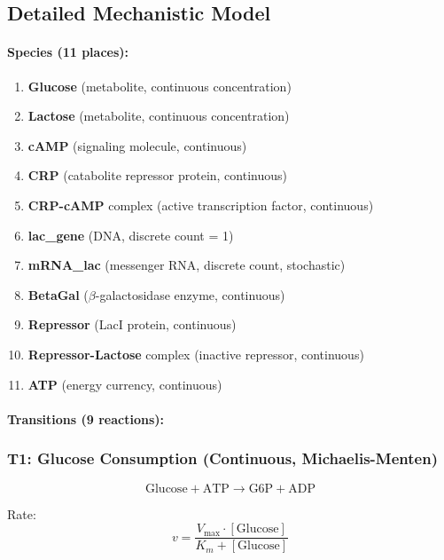 \subsection{Detailed Mechanistic Model}
\label{subsec:lac-model-detailed}

\paragraph{Species (11 places):}
\begin{enumerate}
    \item \textbf{Glucose} (metabolite, continuous concentration)
    \item \textbf{Lactose} (metabolite, continuous concentration)
    \item \textbf{cAMP} (signaling molecule, continuous)
    \item \textbf{CRP} (catabolite repressor protein, continuous)
    \item \textbf{CRP-cAMP} complex (active transcription factor, continuous)
    \item \textbf{lac\_gene} (DNA, discrete count = 1)
    \item \textbf{mRNA\_lac} (messenger RNA, discrete count, stochastic)
    \item \textbf{BetaGal} ($\beta$-galactosidase enzyme, continuous)
    \item \textbf{Repressor} (LacI protein, continuous)
    \item \textbf{Repressor-Lactose} complex (inactive repressor, continuous)
    \item \textbf{ATP} (energy currency, continuous)
\end{enumerate}

\paragraph{Transitions (9 reactions):}

\subsubsection{T1: Glucose Consumption (Continuous, Michaelis-Menten)}

\begin{equation}
\text{Glucose} + \text{ATP} \to \text{G6P} + \text{ADP}
\end{equation}

Rate:
\begin{equation}
v = \frac{V_{\max} \cdot [\text{Glucose}]}{K_m + [\text{Glucose}]}
\end{equation}

